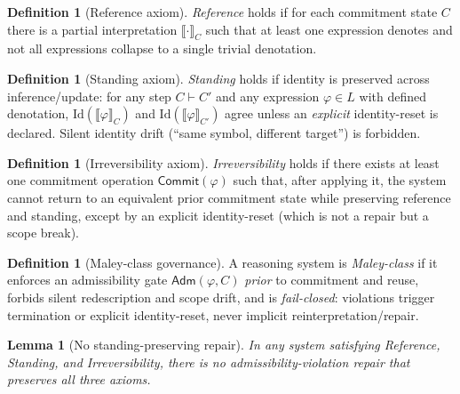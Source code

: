 \documentclass[11pt]{article}
\newtheorem{lemma}[theorem]{Lemma}
\theoremstyle{definition}
\newtheorem{definition}[theorem]{Definition}
\newcommand{\Adm}{\mathsf{Adm}}
\begin{document}
\begin{definition}[Reference axiom]
\emph{Reference} holds if for each commitment state $C$ there is a partial interpretation $\llbracket\cdot\rrbracket_{C}$ such that at least one expression denotes and not all expressions collapse to a single trivial denotation.
\end{definition}

\begin{definition}[Standing axiom]
\emph{Standing} holds if identity is preserved across inference/update:
for any step $C\vdash C'$ and any expression $\varphi\in L$ with defined denotation, $\mathrm{Id}(\llbracket\varphi\rrbracket_{C})$ and $\mathrm{Id}(\llbracket\varphi\rrbracket_{C'})$ agree unless an \emph{explicit} identity-reset is declared.
Silent identity drift (``same symbol, different target'') is forbidden.
\end{definition}

\begin{definition}[Irreversibility axiom]
\emph{Irreversibility} holds if there exists at least one commitment operation $\mathsf{Commit}(\varphi)$ such that, after applying it, the system cannot return to an equivalent prior commitment state while preserving reference and standing, except by an explicit identity-reset (which is not a repair but a scope break).
\end{definition}

\begin{definition}[Maley-class governance]
A reasoning system is \emph{Maley-class} if it enforces an admissibility gate $\Adm(\varphi,C)$ \emph{prior} to commitment and reuse, forbids silent redescription and scope drift, and is \emph{fail-closed}: violations trigger termination or explicit identity-reset, never implicit reinterpretation/repair.
\end{definition}

\begin{lemma}[No standing-preserving repair]
\label{lem:no-standing-repair}
In any system satisfying Reference, Standing, and Irreversibility, there is no admissibility-violation repair that preserves all three axioms.
\end{lemma}
\end{document}
